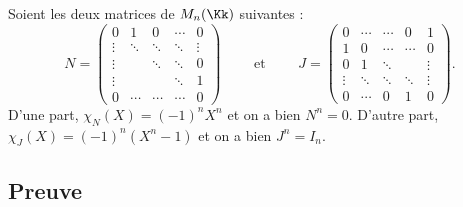 \documentclass[12pt, class=report,crop=false]{standalone}
\begin{document}
\begin{exemple}
Soient les deux matrices de $M_n(\Kk)$ suivantes :
\[N = \begin{pmatrix}
0& 1& 0 &\cdots&0\\
\vdots&\ddots&\ddots&\ddots&\vdots\\
\vdots&&\ddots&\ddots&0\\
\vdots&& &\ddots&1\\
0 &\cdots&\cdots &\cdots&0
\end{pmatrix}
\qquad  \text{ et } \qquad 
J = \begin{pmatrix}
0&\cdots&\cdots&0&1\\
1&0 & \cdots&\cdots&0\\
0&1&\ddots&&\vdots\\
\vdots&\ddots&\ddots&\ddots&\vdots\\
0&\cdots&0&1&0
\end{pmatrix}.\]
D'une part, $\chi_N(X) = (-1)^nX^n$ et on a bien $N^n=0$.
D'autre part, $\chi_J(X) = (-1)^n(X^n -1)$  et on a bien $J^n = I_n$.
\end{exemple}


\subsection{Preuve}
\end{document}
